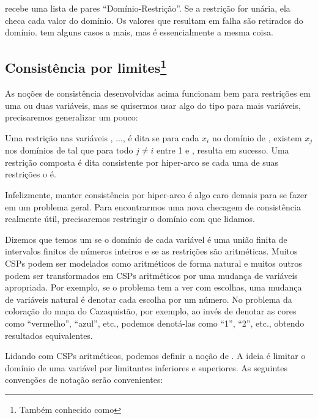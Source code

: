 \inputminted{prolog}{../Exemplos/Cap9/arc_consistency.pl}\label{lst:arc_consistency}

 recebe uma lista de pares ``Domínio-Restrição''. Se a restrição for unária, ela checa cada valor do domínio.
Os valores que resultam em falha são retirados do domínio.  tem alguns casos a mais, mas é essencialmente a mesma coisa.

\subsection{Consistência por limites\footnote{Também conhecido como }}

As noções de consistência desenvolvidas acima funcionam bem para restrições em uma ou duas variáveis,
mas se quisermos usar algo do tipo para mais variáveis, precisaremos generalizar um pouco:

\begin{definition}
  Uma restrição  nas variáveis , ...,  é dita 
  se para cada $x_i$ no domínio de , existem $x_j$ nos domínios de  tal que
  para todo $j \neq i$ entre 1 e ,  resulta em
  sucesso. Uma restrição composta é dita consistente por hiper-arco se cada uma de suas restrições o é.
\end{definition}

Infelizmente, manter consistência por hiper-arco é algo caro demais para se fazer em um problema geral. Para
encontrarmos uma nova checagem de consistência realmente útil, precisaremos restringir o domínio com que lidamos.

Dizemos que temos um  se o domínio de cada variável é uma união
finita de intervalos finitos de números inteiros e se as restrições são aritméticas. Muitos CSPs
podem ser modelados como aritméticos de forma natural e muitos outros podem ser transformados em
CSPs aritméticos por uma mudança de variáveis apropriada.
Por exemplo, se o problema tem a ver com escolhas, uma mudança de variáveis natural é denotar cada
escolha por um número. No problema da coloração do mapa do Cazaquistão, por exemplo, ao invés de
denotar as cores como ``vermelho'', ``azul'', etc., podemos denotá-las como ``1'', ``2'', etc., obtendo resultados equivalentes.

Lidando com CSPs aritméticos, podemos definir a noção de . A ideia é limitar o domínio
de uma variável por limitantes inferiores e superiores. As seguintes convenções de notação serão convenientes:

